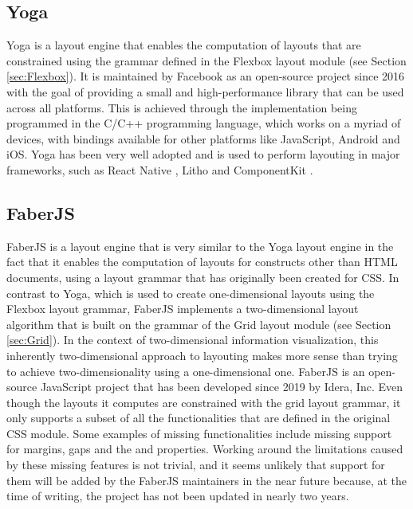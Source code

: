 \subsection{Yoga}
\label{sec:Yoga}

Yoga \parencite{Yoga} is a layout engine that enables the computation of layouts that are constrained using the grammar defined in the Flexbox layout module (see Section \ref{sec:Flexbox}). 
It is maintained by Facebook as an open-source project since 2016 \parencite{YogaRelease} with the goal of providing a small and high-performance library that can be used across all platforms. 
This is achieved through the implementation being programmed in the C/C++ programming language, which works on a myriad of devices, with bindings available for other platforms like JavaScript, Android and iOS.
Yoga has been very well adopted and is used to perform layouting in major frameworks, such as React Native \parencite{ReactNative}, Litho \parencite{Litho} and ComponentKit \parencite{ComponentKit}.

\subsection{FaberJS}
\label{sec:FaberJS}

FaberJS \parencite{FaberJS} is a layout engine that is very similar to the Yoga layout engine in the fact that it enables the computation of layouts for constructs other than HTML documents, using a layout grammar that has originally been created for CSS. 
In contrast to Yoga, which is used to create one-dimensional layouts using the Flexbox layout grammar, FaberJS implements a two-dimensional layout algorithm that is built on the grammar of the Grid layout module (see Section \ref{sec:Grid}). 
In the context of two-dimensional information visualization, this inherently two-dimensional approach to layouting makes more sense than trying to achieve two-dimensionality using a one-dimensional one. 
FaberJS is an open-source JavaScript project that has been developed since 2019 by Idera, Inc.
Even though the layouts it computes are constrained with the grid layout grammar, it only supports a subset of all the functionalities that are defined in the original CSS module. 
Some examples of missing functionalities include missing support for margins, gaps and the  and  properties. 
Working around the limitations caused by these missing features is not trivial, and it seems unlikely that support for them will be added by the FaberJS maintainers in the near future because, at the time of writing, the project has not been updated in nearly two years. 

